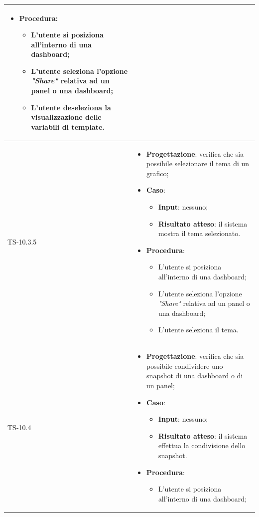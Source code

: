 \begin{longtable}{|C{2.5cm}|C{13cm}|}
\begin{itemize}
\begin{itemize}
	\end{itemize}
	\item \textbf{Procedura}:
	\begin{itemize}
		\item L'utente si posiziona all'interno di una dashboard;
		\item L'utente seleziona l'opzione \emph{"Share"} relativa ad un panel o una dashboard;
		\item L'utente deseleziona la visualizzazione delle variabili di template.
	\end{itemize} 
\end{itemize}
	  \\
	\hline
	{TS-10.3.5} &
\begin{itemize}
	\item \textbf{Progettazione}: verifica che sia possibile selezionare il
	tema di un grafico;
	\item \textbf{Caso}: 
	\begin{itemize}
		\item \textbf{Input}: nessuno;
		\item \textbf{Risultato atteso}: il sistema mostra il tema selezionato.
	\end{itemize}
	\item \textbf{Procedura}:
	\begin{itemize}
		\item L'utente si posiziona all'interno di una dashboard;
		\item L'utente seleziona l'opzione \emph{"Share"} relativa ad un panel o una dashboard;
		\item L'utente seleziona il tema.
	\end{itemize} 
\end{itemize}
	  \\
	\hline
	{TS-10.4} & 
\begin{itemize}
	\item \textbf{Progettazione}: verifica che sia possibile condividere uno
	snapshot di una dashboard o di un panel;
	\item \textbf{Caso}: 
	\begin{itemize}
		\item \textbf{Input}: nessuno;
		\item \textbf{Risultato atteso}: il sistema effettua la condivisione dello snapshot.
	\end{itemize}
	\item \textbf{Procedura}:
	\begin{itemize}
		\item L'utente si posiziona all'interno di una dashboard;

\end{itemize}
\end{itemize}
\end{longtable}
